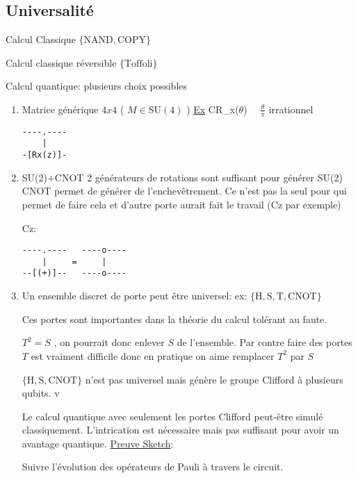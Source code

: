 


\setcounter{subsection}{5}
\setcounter{section}{2}

\subsection{Universalité}

Calcul Classique $\{ \text{NAND}, \text{COPY}   \} $ 

Calcul classique réversible $\{ \text{Toffoli}  \} $ 

Calcul quantique: plusieurs choix possibles

\begin{enumerate}
	\item Matrice générique $4x4$ ( $M\in \text{SU}(4) $  )
		\underline{Ex} CR_x($\theta$)  $\quad \frac{ \theta}{\pi}$ irrationnel 
\begin{verbatim}
----.----
    |
-[Rx(z)]-
\end{verbatim}
\item SU(2)+CNOT
	2 générateurs de rotations sont suffisant pour générer SU(2)
	CNOT permet de générer de l'enchevêtrement. Ce n'est pas la seul pour qui permet de faire cela et d'autre porte aurait fait le travail (Cz par exemple)

Cz:
\begin{verbatim}
----.----   ----o----
    |     =     |
--[(+)]--   ----o----
\end{verbatim}

\item Un ensemble discret de porte peut être universel:
	ex: $\{ \text{H}, \text{S}, \text{T}, \text{CNOT}     \} $ 

Ces portes sont importantes dans la théorie du calcul tolérant au faute.

$T^2=S$ , on pourrait donc enlever $S$ de l'ensemble. Par contre faire des portes $T$ est vraiment difficile donc en pratique on aime remplacer $T^{2}$ par $S$      

\begin{tcolorbox}[title=]
	$\{ \text{H} , \text{S} , \text{CNOT}  \} $ n'est pas universel mais génère le groupe Clifford à plusieurs qubits. 
v
\end{tcolorbox}

\begin{tcolorbox}[title=Gotesman-Krill 98]
	 Le calcul quantique avec seulement les portes Clifford peut-être simulé classiquement.
	 L'intrication est nécessaire mais pas suffisant pour avoir un avantage quantique.
	 \underline{Preuve Sketch}: 

	 Suivre l'évolution des opérateurs de Pauli à travers le circuit. 
\end{tcolorbox}
\end{enumerate}

